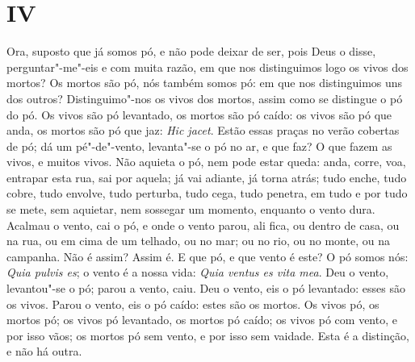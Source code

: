 \section*{IV}

Ora, suposto que já somos pó, e não pode deixar de ser, pois Deus o
disse, perguntar"-me"-eis e com muita razão, em que nos distinguimos logo
os vivos dos mortos? Os mortos são pó, nós também somos pó: em que nos
distinguimos uns dos outros? Distinguimo"-nos os vivos dos mortos, assim
como se distingue o pó do pó. Os vivos são pó levantado, os mortos são
pó caído: os vivos são pó que anda, os mortos são pó que jaz: \emph{Hic
jacet}. Estão essas praças no verão cobertas de pó; dá um pé"-de"-vento,
levanta"-se o pó no ar, e que faz? O que fazem as vivos, e muitos vivos.
Não aquieta o pó, nem pode estar queda: anda, corre, voa, entrapar esta
rua, sai por aquela; já vai adiante, já torna atrás; tudo enche, tudo
cobre, tudo envolve, tudo perturba, tudo cega, tudo penetra, em tudo e
por tudo se mete, sem aquietar, nem sossegar um momento, enquanto o
vento dura. Acalmau o vento, cai o pó, e onde o vento parou, ali fica,
ou dentro de casa, ou na rua, ou em cima de um telhado, ou no mar; ou no
rio, ou no monte, ou na campanha. Não é assim? Assim é. E que pó, e que
vento é este? O pó somos nós:
\emph{Quia pulvis es}; o vento é a nossa vida: \emph{Quia ventus es vita
mea}. Deu o vento, levantou"-se o pó; parou a vento, caiu. Deu o %
vento, eis o pó levantado: esses são os vivos. Parou o vento, eis o pó
caído: estes são os mortos. Os vivos pó, os mortos pó; os vivos pó
levantado, os mortos pó caído; os vivos pó com vento, e por isso vãos;
os mortos pó sem vento, e por isso sem vaidade. Esta é a distinção, e
não há outra.

